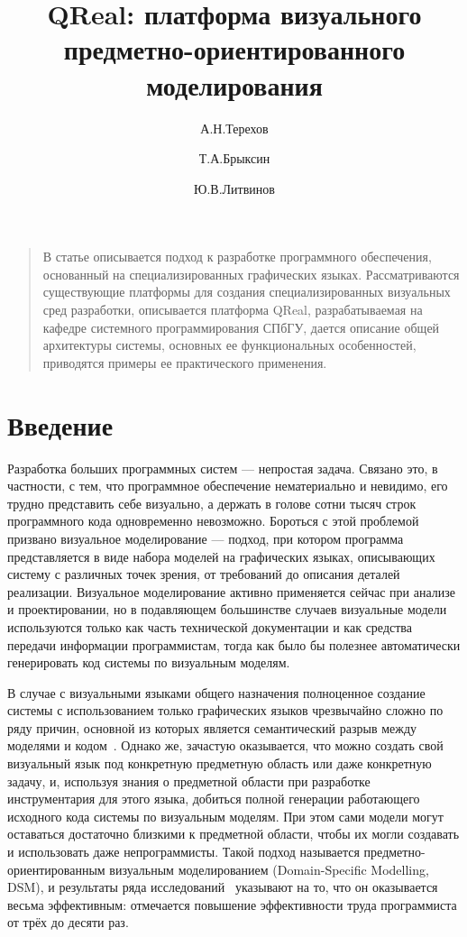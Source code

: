 \documentclass[a4, 12pt]{article}
\title{QReal: платформа визуального предметно-ориентированного моделирования}
\author{А.Н.Терехов \and Т.А.Брыксин \and Ю.В.Литвинов}
\date{}
\begin{document}
\maketitle
\thispagestyle{empty}

\begin{quote}
\small\noindent
В статье описывается подход к разработке программного обеспечения, основанный на специализированных графических языках. Рассматриваются существующие платформы для создания специализированных визуальных сред разработки, описывается платформа QReal, разрабатываемая на кафедре системного программирования СПбГУ, дается описание общей архитектуры системы, основных ее функциональных особенностей, приводятся примеры ее практического применения.
\end{quote}

\section*{Введение}

Разработка больших программных систем --- непростая задача. Связано это, в частности, с тем, что программное обеспечение нематериально и невидимо, его трудно представить себе визуально, а держать в голове сотни тысяч строк программного кода одновременно невозможно. Бороться с этой проблемой призвано визуальное моделирование --- подход, при котором программа представляется в виде набора моделей на графических языках, описывающих систему с различных точек зрения, от требований до описания деталей реализации. Визуальное моделирование активно применяется сейчас при анализе и проектировании, но в подавляющем большинстве случаев визуальные модели используются только как часть технической документации и как средства передачи информации программистам, тогда как было бы полезнее автоматически генерировать код системы по визуальным моделям.

В случае с визуальными языками общего назначения полноценное создание системы с использованием только графических языков чрезвычайно сложно по ряду причин, основной из которых является семантический разрыв между моделями и кодом~\cite{koznov}. Однако же, зачастую оказывается, что можно создать свой визуальный язык под конкретную предметную область или даже конкретную задачу, и, используя знания о предметной области при разработке инструментария для этого языка, добиться полной генерации работающего исходного кода системы по визуальным моделям. При этом сами модели могут оставаться достаточно близкими к предметной области, чтобы их могли создавать и использовать даже непрограммисты. Такой подход называется предметно-ориентированным визуальным моделированием (Domain-Specific Modelling, DSM), и результаты ряда исследований~\cite{dsm2, dsm3, dsm1} указывают на то, что он оказывается весьма эффективным: отмечается повышение эффективности труда программиста от трёх до десяти раз.
\end{document}

